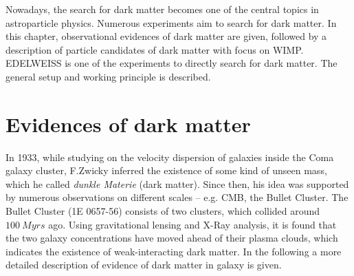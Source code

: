 
Nowadays, the search for dark matter becomes one of the central topics in astroparticle physics.  Numerous experiments aim to search for dark matter. In this chapter, observational evidences of dark matter are given, followed by a description of particle candidates of dark matter with focus on WIMP. EDELWEISS is one of the experiments to directly search for dark matter. The general setup and working principle is described.

\section{Evidences of dark matter}
In 1933, while studying on the velocity dispersion of galaxies inside the Coma galaxy cluster, F.Zwicky inferred the existence of some kind of unseen mass, which he called \textit{dunkle Materie} (dark matter). Since then, his idea was supported by numerous observations on different scales -- e.g. CMB, the Bullet Cluster.
The Bullet Cluster (1E 0657-56) consists of two clusters, which collided around $\SI{100}{Myrs}$ ago. Using gravitational lensing and X-Ray analysis, it is found that the two galaxy concentrations have moved ahead of their plasma clouds, which indicates the existence of weak-interacting dark matter.
In the following a more detailed description of evidence of dark matter in galaxy is given.
